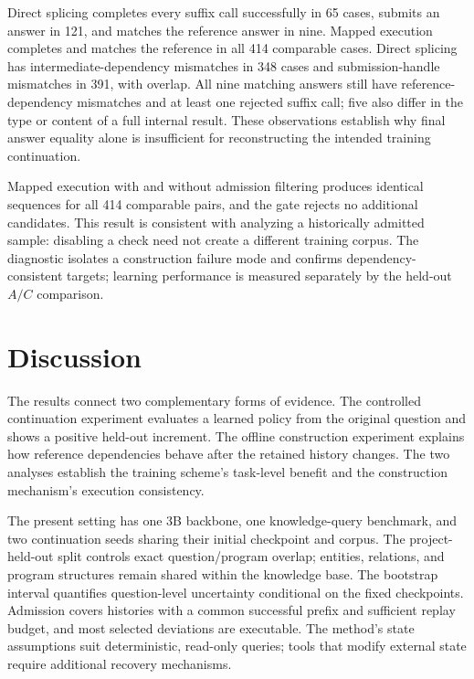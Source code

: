 \documentclass[a4paper,12pt]{article}
\begin{document}
Direct splicing completes every suffix call successfully in 65 cases, submits an answer in 121, and matches the reference answer in nine. Mapped execution completes and matches the reference in all 414 comparable cases. Direct splicing has intermediate-dependency mismatches in 348 cases and submission-handle mismatches in 391, with overlap. All nine matching answers still have reference-dependency mismatches and at least one rejected suffix call; five also differ in the type or content of a full internal result. These observations establish why final answer equality alone is insufficient for reconstructing the intended training continuation.

Mapped execution with and without admission filtering produces identical sequences for all 414 comparable pairs, and the gate rejects no additional candidates. This result is consistent with analyzing a historically admitted sample: disabling a check need not create a different training corpus. The diagnostic isolates a construction failure mode and confirms dependency-consistent targets; learning performance is measured separately by the held-out $A/C$ comparison.

\section{Discussion}

The results connect two complementary forms of evidence. The controlled continuation experiment evaluates a learned policy from the original question and shows a positive held-out increment. The offline construction experiment explains how reference dependencies behave after the retained history changes. The two analyses establish the training scheme's task-level benefit and the construction mechanism's execution consistency.

The present setting has one 3B backbone, one knowledge-query benchmark, and two continuation seeds sharing their initial checkpoint and corpus. The project-held-out split controls exact question/program overlap; entities, relations, and program structures remain shared within the knowledge base. The bootstrap interval quantifies question-level uncertainty conditional on the fixed checkpoints. Admission covers histories with a common successful prefix and sufficient replay budget, and most selected deviations are executable. The method's state assumptions suit deterministic, read-only queries; tools that modify external state require additional recovery mechanisms.
\end{document}
